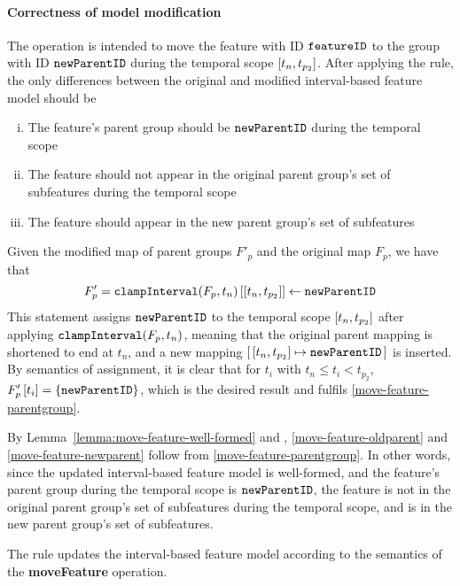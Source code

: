 \paragraph{Correctness of model modification}
The operation is intended to move the feature with ID $\texttt{featureID}$ to the group with ID $\texttt{newParentID}$ during the temporal scope $\interval{t_n}{t_{p_2}}$. After applying the  rule, the only differences between the original and modified interval-based feature model should be
\begin{enumerate}[(i)]
   \item The feature's parent group should be $\texttt{newParentID}$ during the temporal scope \label{move-feature-parentgroup}
   \item The feature should not appear in the original parent group's set of subfeatures during the temporal scope \label{move-feature-oldparent}
   \item The feature should appear in the new parent group's set of subfeatures \label{move-feature-newparent}
\end{enumerate}

Given the modified map of parent groups $F'_p$ and the original map $F_p$, we have that
\[
   F'_p = \lookup{\var{clampInterval}(F_p, t_n)}{\interval{t_n}{t_{p_2}}} \assign \var{newParentID}
\]
This statement assigns $\texttt{newParentID}$ to the temporal scope $\interval{t_n}{t_{p_2}}$ after applying $\texttt{clampInterval}(F_p, t_n)$, meaning that the original parent mapping is shortened to end at $t_n$, and a new mapping $\intervalmapping{t_n}{t_{p_2}}{\var{newParentID}}$ is inserted. By semantics of assignment, it is clear that for $t_i$ with $t_n \leq t_i < t_{p_2}$, $F'_p \left[ t_i \right] = \left\{\texttt{newParentID}\right\}$, which is the desired result and fulfils \ref{move-feature-parentgroup}.

By Lemma~\vref{lemma:move-feature-well-formed} and , \ref{move-feature-oldparent} and \ref{move-feature-newparent} follow from \ref{move-feature-parentgroup}. In other words, since the updated interval-based feature model is well-formed, and the feature's parent group during the temporal scope is $\texttt{newParentID}$, the feature is not in the original parent group's set of subfeatures during the temporal scope, and is in the new parent group's set of subfeatures.
\\

\begin{lemma}
   The  rule updates the interval-based feature model according to the semantics of the \textbf{moveFeature} operation.
   \label{lemma:move-feature-mod}
\end{lemma}
